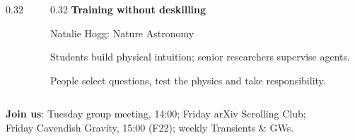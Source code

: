 \documentclass[aspectratio=169]{beamer}
\begin{document}
\begin{frame}[t]
\begin{columns}[T,onlytextwidth]
\begin{column}{0.32\textwidth}
        \end{column}
        \begin{column}{0.32\textwidth}
            \footnotesize
            \textbf{Training without deskilling}\par
            {\scriptsize Natalie Hogg: Nature Astronomy\par}
            \par
            \smallskip
            Students build physical intuition; senior researchers supervise agents.\par
            \smallskip
            People select questions, test the physics and take responsibility.
        \end{column}
    \end{columns}
    \smallskip
    {\scriptsize\textbf{Join us}: Tuesday group meeting, 14:00;
        Friday arXiv Scrolling Club;\\
        Friday Cavendish Gravity, 15:00 (F22);
        weekly Transients \& GWs. \par}
\end{frame}
\end{document}
